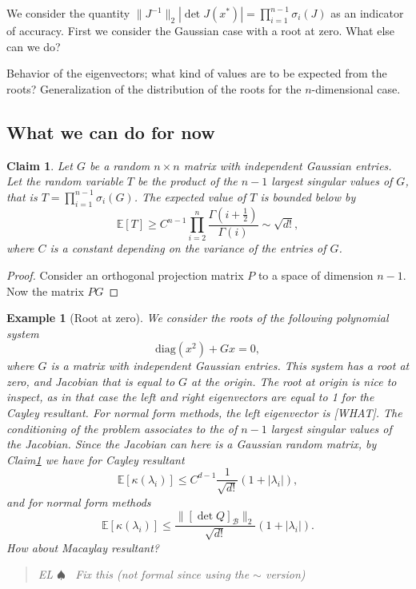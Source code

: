 \documentclass[12pt]{article}
\def\E{\mathbb{E}}
\def\B{\mathcal{B}}
\def\kap{\kappa}
\newenvironment{el}{\begin{quote}\color{amethyst} \small\sf EL $\spadesuit$~}{\end{quote}}
\newtheorem{example}{Example}[section]
\newtheorem{claim}{Claim}[section]
\begin{document}
We consider the quantity $\|J^{-1}\|_2| \det J(x^*) | = \prod_{i=1}^{n-1} \sigma_i(J)$ as an indicator of accuracy.
First we consider the Gaussian case with a root at zero.
What else can we do?


Behavior of the eigenvectors; what kind of values are to be expected from the roots? Generalization of the distribution of the roots for the $n$-dimensional case.

\subsection{What we can do for now}




\begin{claim}\label{res:boundsingvals}
    Let $G$ be a random $n\times n$ matrix with independent Gaussian entries.
    Let the random variable $T$ be the product of the $n-1$ largest singular values of $G$, that is $T = \prod_{i=1}^{n-1} \sigma_i(G)$.
    The expected value of $T$ is bounded below by
    \[ \E[T] \geq C^{n-1} \prod_{i=2}^{n} \frac{\Gamma(i+\frac12)}{\Gamma(i)} \sim \sqrt{d!}, \]
    where $C$ is a constant depending on the variance of the entries of $G$.
\end{claim}
\begin{proof}
    Consider an orthogonal projection matrix $P$ to a space of dimension $n-1$. Now the matrix $PG$ 
\end{proof}







\begin{example}[Root at zero]
    We consider the roots of the following polynomial system
    \[ \mathrm{diag}(x^2) + Gx = 0, \]
    where $G$ is a matrix with independent Gaussian entries. 
    This system has a root at zero, and Jacobian that is equal to $G$ at the origin.
    The root at origin is nice to inspect, as in that case the left and right eigenvectors are equal to 1 for the Cayley resultant.
    For normal form methods, the left eigenvector is [WHAT].
    The conditioning of the problem associates to the of $n-1$ largest singular values of the Jacobian.
    Since the Jacobian can here is a Gaussian random matrix, by Claim\ref{res:boundsingvals} we have for Cayley resultant
    \[ \E[\kap(\lambda_i)] \leq C^{d-1}\frac{1}{\sqrt{d!}}(1+|\lambda_i|), \] 
    and for normal form methods
    \[ \E[\kap(\lambda_i)] \leq \frac{\|[\det Q]_\B\|_2}{\sqrt{d!}}(1+|\lambda_i|). \]
    How about Macaylay resultant?
    \begin{el}
        Fix this (not formal since using the $\sim$ version)
    \end{el}
\end{example}
\end{document}
